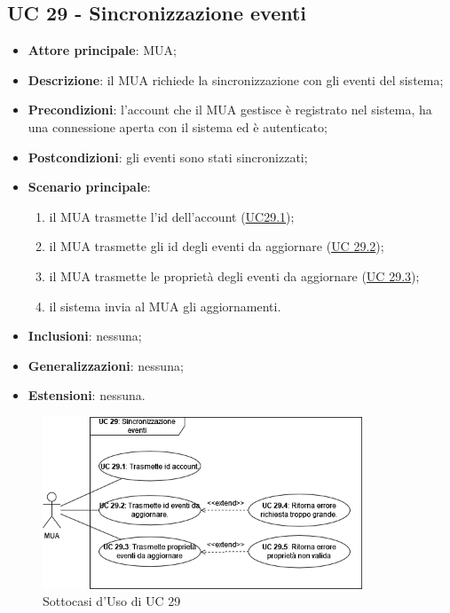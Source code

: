 
\subsection{UC 29 - Sincronizzazione eventi} \label{sec:UC29}
    
    \begin{itemize}
        \item \textbf{Attore principale}: MUA;
        \item \textbf{Descrizione}: il MUA richiede la sincronizzazione con gli eventi del sistema;
        \item \textbf{Precondizioni}: l’account che il MUA gestisce è registrato nel sistema, ha una connessione aperta con il sistema ed è autenticato;
        \item \textbf{Postcondizioni}: gli eventi sono stati sincronizzati;
        \item \textbf{Scenario principale}:
            \begin{enumerate}
                \item il MUA trasmette l'id dell'account (\hyperref[sec:UC29.1]{UC29.1});
                \item il MUA trasmette gli id degli eventi da aggiornare (\hyperref[sec:UC29.2]{UC 29.2});
                \item il MUA trasmette le proprietà degli eventi da aggiornare (\hyperref[sec:UC29.3]{UC 29.3});
                \item il sistema invia al MUA gli aggiornamenti.
            \end{enumerate}
        \item \textbf{Inclusioni}: nessuna;
        \item \textbf{Generalizzazioni}: nessuna;
        \item \textbf{Estensioni}: nessuna.
    \end{itemize}

    \begin{figure}[H]
        \includegraphics[width=0.85\textwidth]{sections/uc_imgs/UC29.png}
        \centering
        \caption{Sottocasi d'Uso di UC 29}
    \end{figure}


